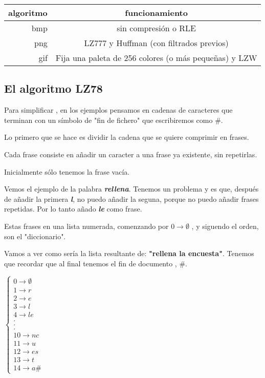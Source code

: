 		\begin{table}[h]
			\centering
			\begin{tabular}{r|c}
			algoritmo & funcionamiento \\ \hline
			bmp & sin compresión o RLE \\
			png & LZ777 y Huffman (con filtrados previos) \\
			gif & Fija una paleta de 256 colores (o más pequeñas) y LZW \\
			\end{tabular}
		\end{table}


	\subsection{El algoritmo LZ78}
	
	Para simplificar , en los ejemplos pensamos en cadenas de caracteres que terminan con un símbolo de "fin de fichero" que escribiremos como \#.
	
	Lo primero que se hace es dividir la cadena que se quiere comprimir en frases.
	
	Cada frase consiste en añadir un caracter a una frase ya existente, sin repetirlas.
	
	Inicialmente sólo tenemos la frase vacía.
	
	Vemos el ejemplo de la palabra \textbf{\textit{rellena}}. Tenemos un problema y es que, después de añadir la primera \textbf{\textit{l}}, no puedo añadir la seguna, porque no puedo añadir frases repetidas. Por lo tanto añado \textbf{\textit{le}} como frase.
	
	Estas frases en una lista numerada, comenzando por $0 \rightarrow \emptyset$ , y siguendo el orden, son el "diccionario".
	
	\begin{example}
		Vamos a ver como sería la lista resultante de: \textbf{"rellena la encuesta"}. Tenemos que recordar que al final tenemos el fin de documento , \#.
		
		
		$\begin{cases}
			0 \rightarrow \emptyset\\
			1\rightarrow r\\
			2 \rightarrow e\\
			3\rightarrow l\\
			4 \rightarrow le\\
			.\\
			.\\
			.\\
			10 \rightarrow nc\\
			11\rightarrow u\\
			12 \rightarrow es\\
			13 \rightarrow t\\
			14 \rightarrow a\#
		\end{cases}$
		
	\end{example}
	
